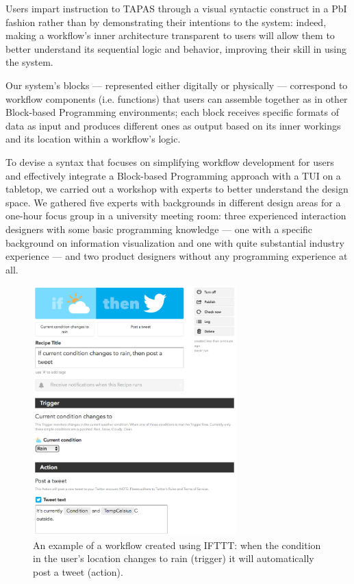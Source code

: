 Users impart instruction to \acs{TAPAS} through a visual syntactic construct in a \ac{PbI} fashion rather than by demonstrating their intentions to the system: indeed, making a workflow's inner architecture transparent to users will allow them to better understand its sequential logic and behavior, improving their skill in using the system.

Our system's blocks --- represented either digitally or physically --- correspond to workflow components (i.e. functions) that users can assemble together as in other Block-based Programming environments; each block receives specific formats of data as input and produces different ones as output based on its inner workings and its location within a workflow's logic.

To devise a syntax that focuses on simplifying workflow development for users and effectively integrate a Block-based Programming approach with a \ac{TUI} on a tabletop, we carried out a workshop with experts to better understand the design space. We gathered five experts with backgrounds in different design areas for a one-hour focus group in a university meeting room: three experienced interaction designers with some basic programming knowledge --- one with a specific background on information visualization and one with quite substantial industry experience --- and two product designers without any programming experience at all.

\begin{figure}[ht!]
\centering
\includegraphics[width=0.7\textwidth]{images/c4/IFTTT.png}
\caption{An example of a workflow created using \ac{IFTTT}: when the condition in the user's location changes to rain (trigger) it will automatically post a tweet  (action).}\label{fig:ifttt}
\end{figure}

